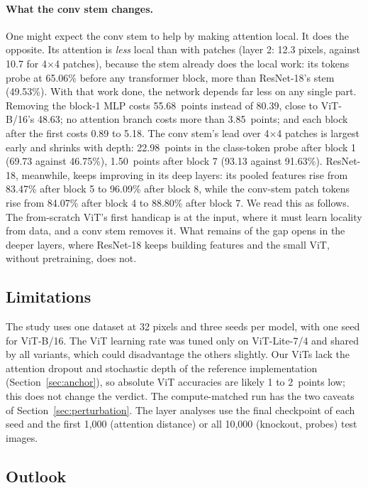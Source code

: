 \documentclass[11pt]{article}
\begin{document}
\paragraph{What the conv stem changes.} One might expect the conv stem to help by making attention local. It does the opposite. Its attention is \emph{less} local than with patches (layer 2: 12.3 pixels, against 10.7 for 4$\times$4 patches), because the stem already does the local work: its tokens probe at 65.06\% before any transformer block, more than ResNet-18's stem (49.53\%). With that work done, the network depends far less on any single part. Removing the block-1 MLP costs 55.68~points instead of 80.39, close to ViT-B/16's 48.63; no attention branch costs more than 3.85~points; and each block after the first costs 0.89 to 5.18. The conv stem's lead over 4$\times$4 patches is largest early and shrinks with depth: 22.98~points in the class-token probe after block 1 (69.73 against 46.75\%), 1.50~points after block 7 (93.13 against 91.63\%). ResNet-18, meanwhile, keeps improving in its deep layers: its pooled features rise from 83.47\% after block 5 to 96.09\% after block 8, while the conv-stem patch tokens rise from 84.07\% after block 4 to 88.80\% after block 7. We read this as follows. The from-scratch ViT's first handicap is at the input, where it must learn locality from data, and a conv stem removes it. What remains of the gap opens in the deeper layers, where ResNet-18 keeps building features and the small ViT, without pretraining, does not.

\subsection{Limitations}

The study uses one dataset at 32 pixels and three seeds per model, with one seed for ViT-B/16. The ViT learning rate was tuned only on ViT-Lite-7/4 and shared by all variants, which could disadvantage the others slightly. Our ViTs lack the attention dropout and stochastic depth of the reference implementation (Section~\ref{sec:anchor}), so absolute ViT accuracies are likely 1 to 2~points low; this does not change the verdict. The compute-matched run has the two caveats of Section~\ref{sec:perturbation}. The layer analyses use the final checkpoint of each seed and the first 1,000 (attention distance) or all 10,000 (knockout, probes) test images.

\subsection{Outlook}
\end{document}
